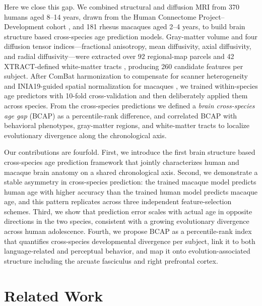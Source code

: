 \documentclass[11pt]{article}
\begin{document}
Here we close this gap. We combined structural and diffusion MRI from 370 humans aged 8--14 years, drawn from the Human Connectome Project--Development cohort \citep{somerville2018lifespan, harms2018extending}, and 181 rhesus macaques aged 2--4 years, to build brain structure based cross-species age prediction models. Gray-matter volume and four diffusion tensor indices---fractional anisotropy, mean diffusivity, axial diffusivity, and radial diffusivity---were extracted over 92 regional-map parcels \citep{bezgin2012hierarchical} and 42 XTRACT-defined white-matter tracts \citep{warrington2020xtract}, producing 260 candidate features per subject. After ComBat harmonization to compensate for scanner heterogeneity \citep{fortin2017harmonization_dti, fortin2017harmonization_thickness, johnson2007adjusting} and INIA19-guided spatial normalization for macaques \citep{rohlfing2012inia19}, we trained within-species age predictors with 10-fold cross-validation and then deliberately applied them across species. From the cross-species predictions we defined a \textit{brain cross-species age gap} (BCAP) as a percentile-rank difference, and correlated BCAP with behavioral phenotypes, gray-matter regions, and white-matter tracts to localize evolutionary divergence along the chronological axis.

Our contributions are fourfold. First, we introduce the first brain structure based cross-species age prediction framework that jointly characterizes human and macaque brain anatomy on a shared chronological axis. Second, we demonstrate a stable asymmetry in cross-species prediction: the trained macaque model predicts human age with higher accuracy than the trained human model predicts macaque age, and this pattern replicates across three independent feature-selection schemes. Third, we show that prediction error scales with actual age in opposite directions in the two species, consistent with a growing evolutionary divergence across human adolescence. Fourth, we propose BCAP as a percentile-rank index that quantifies cross-species developmental divergence per subject, link it to both language-related and perceptual behavior, and map it onto evolution-associated structure including the arcuate fasciculus and right prefrontal cortex.

\section{Related Work}
\end{document}

